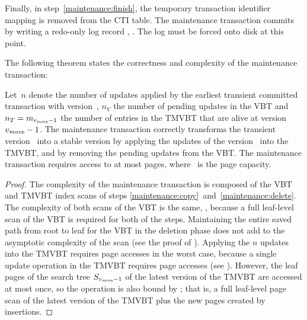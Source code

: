 Finally, in step~\ref{maintenance:finish}, the temporary transaction
identifier mapping is removed from the CTI table.
The maintenance transaction commits by writing a redo-only log record
, . 
The log must be forced onto disk at this point.

The following theorem states the correctness and complexity of the
maintenance transaction:

\thmskip
\begin{theorem}
\label{theorem:cmvbt:maintenance} 
Let~$n$ denote the number of updates applied by the earliest
transient committed transaction with version~\movever, $n_V$ the
number of pending updates in the VBT and $n_T = m_{\smash{v_{\text{\textit{move}}}}-1}$ the
number of entries in the TMVBT that are alive at version~$\smash{v_{\text{\textit{move}}}} - 1$. 
The maintenance transaction correctly transforms the transient version
\movever\ into a stable version by applying the updates of the version
\movever\ into the TMVBT, and by removing the pending updates from
the VBT\@. 
The maintenance transaction requires access to at most  pages, where
\capacity\ is the page capacity.
\end{theorem}
\begin{proof}
The complexity of the maintenance transaction is composed of the VBT and
TMVBT index scans of steps
\ref{maintenance:copy}~and~\ref{maintenance:delete}.
The complexity of both scans of the VBT is the same, , because a
full leaf-level scan of the VBT is required for both of the steps. 
Maintaining the entire saved path from root to leaf for the VBT in the
deletion phase does not add to the asymptotic complexity of the scan (see
the proof of ). 
Applying the $n$ updates into the TMVBT requires  page accesses in the worst case, because a single update operation in the
TMVBT requires  page accesses (see
).
However, the leaf pages of the search tree $S_{\smash{v_{\text{\textit{move}}}}-1}$ of the latest
version of the TMVBT are accessed at most once, so the operation is also
bound by ; that is, a full leaf-level page scan of
the latest version of the TMVBT plus the new pages created by insertions.
\end{proof}
\thmskip

